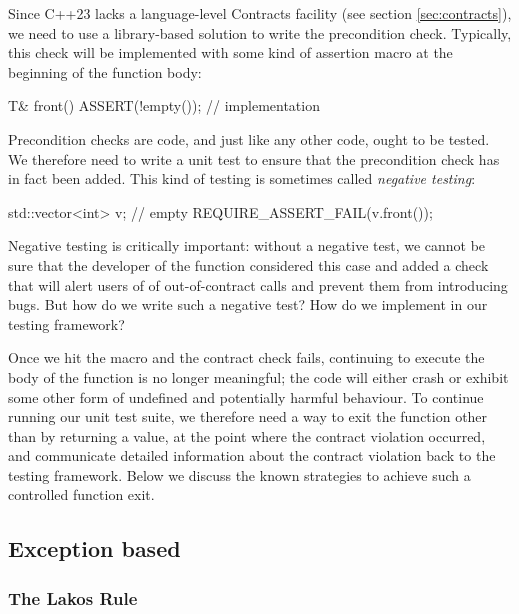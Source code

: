 Since C++23 lacks a language-level Contracts facility (see section \ref{sec:contracts}), we need to use a library-based solution to write the precondition check. Typically, this check will be implemented with some kind of assertion macro at the beginning of the function body:
\begin{codeblock}
T& front() {
  ASSERT(!empty());
  // implementation
}
\end{codeblock}


Precondition checks are code, and just like any other code, ought to be tested. We therefore need to write a unit test to ensure that the precondition check has in fact been added. This kind of testing is sometimes called \emph{negative testing}:

\begin{codeblock}
std::vector<int> v;  // empty
REQUIRE_ASSERT_FAIL(v.front());
\end{codeblock}
Negative testing is critically important: without a negative test, we cannot be sure that the developer of the  function considered this case and added a check that will alert users of  of out-of-contract calls and prevent them from introducing bugs.
But how do we write such a negative test? How do we implement  in our testing framework?

Once we hit the  macro and the contract check fails, continuing to execute the body of the function is no longer meaningful; the code will either crash or exhibit some other form of undefined and potentially harmful behaviour. To continue running our unit test suite, we therefore need a way to exit the function other than by returning a value, at the point where the contract violation occurred, and communicate detailed information about the contract violation back to the testing framework. Below we discuss the known strategies to achieve such a controlled function exit.

\subsection{Exception based}

\subsubsection{The Lakos Rule}


